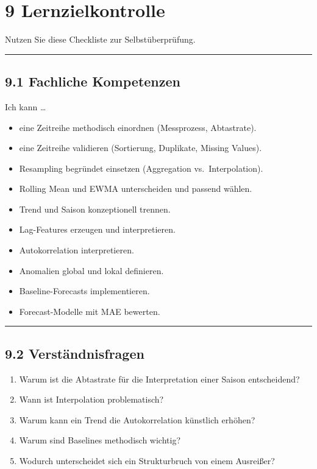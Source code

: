 \documentclass[
  ngerman,
  letterpaper,
  DIV=11]{scrreprt}
\providecommand{\tightlist}{%
  \setlength{\itemsep}{0pt}\setlength{\parskip}{0pt}}
\begin{document}

\chapter{9 Lernzielkontrolle}\label{lernzielkontrolle-1}

Nutzen Sie diese Checkliste zur Selbstüberprüfung.

\begin{center}\rule{0.5\linewidth}{0.5pt}\end{center}

\section{9.1 Fachliche Kompetenzen}\label{fachliche-kompetenzen}

Ich kann \ldots{}

\begin{itemize}
\tightlist
\item[$\square$]
  eine Zeitreihe methodisch einordnen (Messprozess, Abtastrate).
\item[$\square$]
  eine Zeitreihe validieren (Sortierung, Duplikate, Missing Values).
\item[$\square$]
  Resampling begründet einsetzen (Aggregation vs.~Interpolation).
\item[$\square$]
  Rolling Mean und EWMA unterscheiden und passend wählen.
\item[$\square$]
  Trend und Saison konzeptionell trennen.
\item[$\square$]
  Lag-Features erzeugen und interpretieren.
\item[$\square$]
  Autokorrelation interpretieren.
\item[$\square$]
  Anomalien global und lokal definieren.
\item[$\square$]
  Baseline-Forecasts implementieren.
\item[$\square$]
  Forecast-Modelle mit MAE bewerten.
\end{itemize}

\begin{center}\rule{0.5\linewidth}{0.5pt}\end{center}

\section{9.2 Verständnisfragen}\label{verstuxe4ndnisfragen}

\begin{enumerate}
\def\labelenumi{\arabic{enumi}.}
\tightlist
\item
  Warum ist die Abtastrate für die Interpretation einer Saison
  entscheidend?
\item
  Wann ist Interpolation problematisch?
\item
  Warum kann ein Trend die Autokorrelation künstlich erhöhen?
\item
  Warum sind Baselines methodisch wichtig?
\item
  Wodurch unterscheidet sich ein Strukturbruch von einem Ausreißer?
\end{enumerate}
\end{document}
